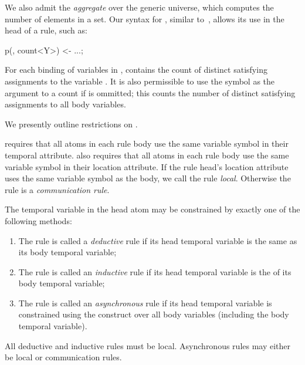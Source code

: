 We also admit the  {\em aggregate} over the generic universe, which computes the number of elements in a set.  Our syntax for , similar to~\cite{datalog-agg}, allows its use in the head of a rule, such as:

\begin{Dedalus}
p(, count<Y>) <- ...;
\end{Dedalus}

For each binding of variables in ,  contains the count of distinct satisfying assignments to the variable .  It is also permissible to use the symbol \dedalus{*} as the argument to a count if  is ommitted; this counts the number of distinct satisfying assignments to all body variables.

We presently outline restrictions on \lang.

\vspace{1em}
\lang requires that all atoms in each rule body use the same variable symbol in their temporal attribute.  \lang also requires that all atoms in each rule body use the same variable symbol in their location attribute.  If the rule head's location attribute uses the same variable symbol as the body, we call the rule {\em local}.  Otherwise the rule is a {\em communication rule}.

The temporal variable in the head atom may be constrained by exactly one of the following methods:

\begin{enumerate}
\item The rule is called a {\em deductive} rule if its head temporal variable is the same as its body temporal variable;
\item The rule is called an {\em inductive} rule if its head temporal variable is the  of its body temporal variable;
\item The rule is called an {\em asynchronous} rule if its head temporal variable is constrained using the  construct over all body variables (including the body temporal variable).
\end{enumerate}

All deductive and inductive rules must be local.  Asynchronous rules may either be local or communication rules.

